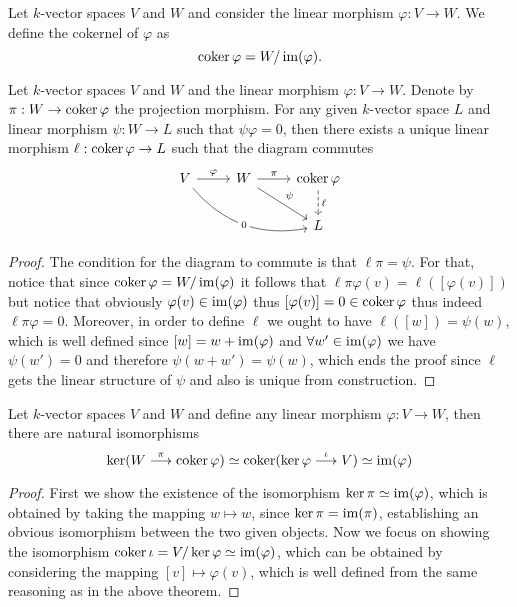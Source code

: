 \begin{definition}[Cokernel]
  Let \(k\)-vector spaces \(V\) and \(W\) and consider the linear morphism
  \(\varphi : V \to W\). We define the cokernel of \(\varphi\) as
  \[
    \operatorname{coker} \varphi = W/\operatorname{im}(\varphi).
  \]
\end{definition}

\begin{theorem}
   Let \(k\)-vector spaces \(V\) and \(W\) and the linear morphism \(\varphi : V
   \to W\). Denote by \(\pi : W \to \operatorname{coker} \varphi\) the projection morphism.
   For any given \(k\)-vector space \(L\) and linear morphism \(\psi : W \to L\)
   such that  \(\psi  \varphi = 0\), then there exists a unique linear
   morphism  \(\ell : \operatorname{coker} \varphi \to L\) such that the diagram commutes
   \[
     \begin{tikzcd}
       V \ar[drr, bend right, "0" description] \ar[r, "\varphi"] &W \ar[r,
       "\pi"] \ar[dr, "\psi"] &\coker \varphi \ar[d, dashed, "\ell"]
       \\
        & &L
     \end{tikzcd}
   \]
\end{theorem}

\begin{proof}
  The condition for the diagram to commute is that \(\ell  \pi = \psi\).
  For that, notice that since \(\operatorname{coker} \varphi = W/\operatorname{im}(\varphi)\) it follows
  that \(\ell  \pi  \varphi (v) = \ell([\varphi(v)])\) but notice that
  obviously \(\varphi(v) \in \operatorname{im}(\varphi)\) thus \([\varphi(v)] = 0 \in \operatorname{coker}
  \varphi\) thus indeed \(\ell  \pi  \varphi = 0\). Moreover, in order
  to define \(\ell\) we ought to have \(\ell([w]) = \psi(w)\), which is well
  defined since \([w] = w + \operatorname{im}(\varphi)\) and \(\forall w' \in \operatorname{im}(\varphi)\)
  we have \(\psi(w') = 0\) and therefore \(\psi(w + w') = \psi(w)\), which ends
  the proof since \(\ell\) gets the linear structure of \(\psi\) and also is
  unique from construction.
\end{proof}

\begin{proposition}
  Let \(k\)-vector spaces \(V\) and \(W\) and define any linear morphism
  \(\varphi : V \to W\), then there are natural isomorphisms
  \[
    \ker(W \overset \pi \longrightarrow \operatorname{coker} \varphi) \simeq \operatorname{coker}(\ker \varphi
    \overset \iota \longrightarrow V) \simeq \operatorname{im}(\varphi)
  \]
\end{proposition}

\begin{proof}
  First we show the existence of the isomorphism \(\ker \pi \simeq \operatorname{im}(\varphi)\),
  which is obtained by taking the mapping \(w \mapsto w\), since \(\ker \pi =
  \operatorname{im}(\pi)\), establishing an obvious isomorphism between the two given objects.
  Now we focus on showing the isomorphism \(\operatorname{coker} \iota = V/\ker \varphi \simeq
  \operatorname{im}(\varphi)\), which can be obtained by considering the mapping \([v] \mapsto
  \varphi(v)\), which is well defined from the same reasoning as in the above
  theorem.
\end{proof}


